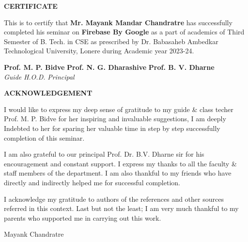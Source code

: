 \documentclass[12pt,a4paper]{report}
\begin{document}
\begin{center}
    \textbf{\huge{CERTIFICATE}}\\
    \vspace{2cm}
\end{center}
\large This is to certify that \textbf{Mr. Mayank Mandar Chandratre} has successfully completed his seminar on \textbf{Firebase By Google} as a part of academics of Third Semester of B. Tech. in CSE as prescribed by Dr. Babasaheb Ambedkar Technological University, Lonere during Academic year 2023-24.

\vspace{5cm}




\begin{center}

    \textbf{Prof. M. P. Bidve} %
    \hspace{1.5cm}
    \textbf{Prof. N. G. Dharashive}
    \hspace{1.5cm}
    \textbf{Prof. B. V. Dharne}\\
    \textit{Guide} %
    \hspace{4cm}
    \textit{H.O.D.}
    \hspace{4cm}
    \textit{Principal}\\
    

\end{center}
\newpage
\begin{center}
    \textbf{\huge{ACKNOWLEDGEMENT}}\\
    \vspace{2cm}
\end{center}
\large I would like to express my deep sense of gratitude to my guide \& class techer Prof. M. P. Bidve for her inspiring and invaluable suggestions, I am deeply Indebted to her for sparing her valuable time in step by step successfully completion of this seminar.

I am also grateful to our principal Prof. Dr. B.V. Dharne sir for his encouragement and constant support. I express my thanks to all the faculty \& staff members of the department. I am also thankful to my friends who have directly and indirectly helped me for successful completion.

I acknowledge my gratitude to authors of the references and other sources referred in this context. Last but not the least; I am very much thankful to my parents who supported me in carrying out this work.

\vspace{3cm}
\hfill Mayank Chandratre %
\end{document}
